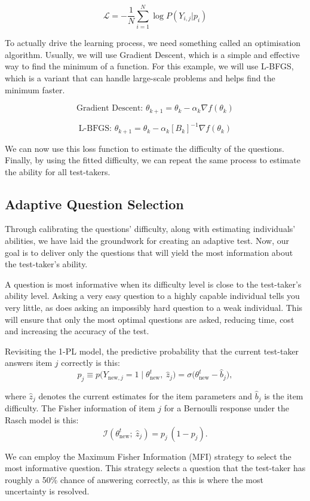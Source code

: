 \documentclass{article}
\begin{document}
\[
\mathcal{L} = -\frac{1}{N} \sum_{i=1}^{N}\log P(Y_{i,j} | p_i)
\]

To actually drive the learning process, we need something called an optimisation algorithm. Usually, we will use Gradient Descent, which is a simple and effective way to find the minimum of a function. For this example, we will use L-BFGS, which is a variant that can handle large-scale problems and helps find the minimum faster.

\[
\text{Gradient Descent: } \theta_{k+1} = \theta_k - \alpha_k \nabla f(\theta_k)
\]

\[
\text{L-BFGS: } \theta_{k+1} = \theta_k - \alpha_k [B_k]^{-1} \nabla f(\theta_k)
\]

We can now use this loss function to estimate the difficulty of the questions. Finally, by using the fitted difficulty, we can repeat the same process to estimate the ability for all test-takers.

\subsection*{Adaptive Question Selection}

Through calibrating the questions' difficulty, along with estimating individuals' abilities, we have laid the groundwork for creating an adaptive test. Now, our goal is to deliver only the questions that will yield the most information about the test-taker's ability.

A question is most informative when its difficulty level is close to the test-taker's ability level. Asking a very easy question to a highly capable individual tells you very little, as does asking an impossibly hard question to a weak individual. This will ensure that only the most optimal questions are asked, reducing time, cost and increasing the accuracy of the test.

Revisiting the 1-PL model, the predictive probability that the current test-taker answers item $j$ correctly is this:
\[
p_j \equiv p\big(Y_{\text{new},j}=1\mid \theta^{t}_{\text{new}},\ \hat z_j\big)
= \sigma\big(\theta^{t}_{\text{new}} - \hat b_j\big),
\]

where $\hat z_j$ denotes the current estimates for the item parameters and $\hat b_j$ is the item difficulty. The Fisher information of item $j$ for a Bernoulli response under the Rasch model is this:
\[
\mathcal I\!\left(\theta^{t}_{\text{new}};\ \hat z_j\right)
= p_j\,(1-p_j).
\tag{1}
\]

We can employ the Maximum Fisher Information (MFI) strategy to select the most informative question. This strategy selects a question that the test-taker has roughly a 50\% chance of answering correctly, as this is where the most uncertainty is resolved.
\end{document}
